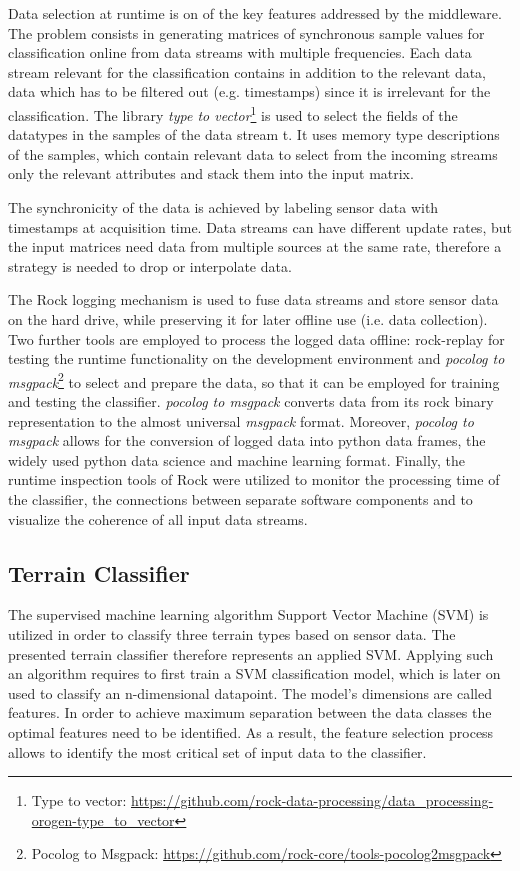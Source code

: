 \documentclass{article}
\begin{document}
Data selection at runtime is on of the key features addressed by the middleware. 
The problem consists in generating matrices of synchronous sample values for classification online from data streams with multiple frequencies.
Each data stream relevant for the classification contains in addition to the relevant data, data which has to be filtered out (e.g. timestamps) since it is irrelevant for the classification.
The library \emph{type to vector}\footnote{Type to vector: \url{https://github.com/rock-data-processing/data_processing-orogen-type_to_vector}} is used
to select the fields of the datatypes in the samples of the data stream t. It uses memory type descriptions of the samples, which contain relevant data to select from the incoming streams only the relevant attributes and stack them into the input matrix. 

The synchronicity of the data is achieved by labeling sensor data with timestamps at acquisition time.
Data streams can have different update rates, but the input matrices need data from multiple sources at the same rate, therefore a strategy is needed to drop or interpolate data. 

The Rock logging mechanism is used to fuse data streams and store sensor data on the hard drive, while preserving it for later offline use (i.e. data collection). 
Two further tools are employed to process the logged data offline: rock-replay for testing the runtime functionality on the development environment and \emph{pocolog to msgpack}\footnote{Pocolog to Msgpack: \url{https://github.com/rock-core/tools-pocolog2msgpack}} to select and prepare the data, so that it can be employed for training and testing the classifier.
\emph{pocolog to msgpack} converts data from its rock binary representation to the almost universal \emph{msgpack} format.
Moreover, \emph{pocolog to msgpack} allows for the conversion of logged data into python data frames, the widely used python data science and machine learning format. 
Finally, the runtime inspection tools of Rock were utilized to monitor the processing time of the classifier, the connections between separate software components and to visualize the coherence of all input data streams. 


\subsection{Terrain Classifier}

The supervised machine learning algorithm Support Vector Machine (SVM) is utilized in order to classify three terrain types based on sensor data. The presented terrain classifier therefore represents an applied SVM. Applying such an algorithm requires to first train a SVM classification model, which is later on used to classify an n-dimensional datapoint.
The model's dimensions are called features. In order to achieve maximum separation between the data classes the optimal features need to be identified. As a result, the feature selection process allows to identify the most critical set of input data to the classifier. 
\end{document}

